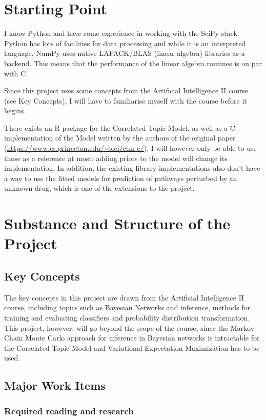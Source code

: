 \documentclass[12pt,a4]{article}
\begin{document}
\section*{Starting Point}

I know Python and have some experience in working with the SciPy stack. Python has lots of facilities for data processing and while it is an interpreted language, NumPy uses native LAPACK/BLAS (linear algebra) libraries as a backend. This means that the performance of the linear algebra routines is on par with C.

Since this project uses some concepts from the Artificial Intelligence II course (see Key Concepts), I will have to familiarise myself with the course before it begins.

There exists an R package for the Correlated Topic Model, as well as a C implementation of the Model written by the authors of the original paper (\url{https://www.cs.princeton.edu/~blei/ctm-c/}). I will however only be able to use those as a reference at most: adding priors to the model will change its implementation. In addition, the existing library implementations also don't have a way to use the fitted models for prediction of pathways perturbed by an unknown drug, which is one of the extensions to the project.

\section*{Substance and Structure of the Project}

\subsection*{Key Concepts}

The key concepts in this project are drawn from the Artificial Intelligence II course, including topics such as Bayesian Networks and inference, methods for training and evaluating classifiers and probability distribution transformation. This project, however, will go beyond the scope of the course, since the Markov Chain Monte Carlo approach for inference in Bayesian networks is intractable for the Correlated Topic Model and Variational Expectation Maximization has to be used.

\subsection*{Major Work Items}

\subsubsection*{Required reading and research}
\end{document}
